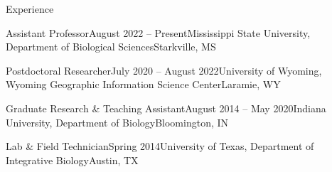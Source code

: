 \documentclass{resume} %
\begin{document}
\begin{rSection}{Experience}

\begin{rSubsection}{Assistant Professor}{August 2022 -- Present}{Mississippi State University, Department of Biological Sciences}{Starkville, MS}
\end{rSubsection}

\begin{rSubsection}{Postdoctoral Researcher}{July 2020 -- August 2022}{University of Wyoming, Wyoming Geographic Information Science Center}{Laramie, WY}
\end{rSubsection}

\begin{rSubsection}{Graduate Research \& Teaching Assistant}{August 2014 -- May 2020}{Indiana University, Department of Biology}{Bloomington, IN}
\end{rSubsection}

\begin{rSubsection}{Lab \& Field Technician}{Spring 2014}{University of Texas, Department of Integrative Biology}{Austin, TX}
\end{rSubsection}

\end{rSection}
\bigskip
\end{document}
